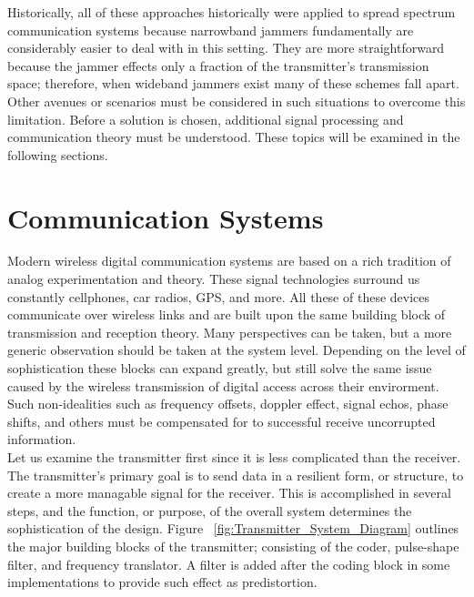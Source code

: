 Historically, all of these approaches historically were applied to spread spectrum communication systems because narrowband jammers fundamentally are considerably easier to deal with in this setting.  They are more straightforward because the jammer effects only a fraction of the transmitter's transmission space; therefore, when wideband jammers exist many of these schemes fall apart.  Other avenues or scenarios must be considered in such situations to overcome this limitation.  Before a solution is chosen, additional signal processing and communication theory must be understood.  These topics will be examined in the following sections.\\



\section{Communication Systems}

Modern wireless digital communication systems are based on a rich tradition of analog experimentation and theory.  These signal technologies surround us constantly cellphones, car radios, GPS, and more.  All these of these devices communicate over wireless links and are built upon the same building block of transmission and reception theory.  Many perspectives can be taken, but a more generic observation should be taken at the system level.  Depending on the level of sophistication these blocks can expand greatly, but still solve the same issue caused by the wireless transmission of digital access across their envirorment.  Such non-idealities such as frequency offsets, doppler effect, signal echos, phase shifts, and others must be compensated for to successful receive uncorrupted information.\\ 

Let us examine the transmitter first since it is less complicated than the receiver.  The transmitter's primary goal is to send data in a resilient form, or structure, to create a more managable signal for the receiver.  This is accomplished in several steps, and the function, or purpose, of the overall system determines the sophistication of the design.  Figure ~\ref{fig:Transmitter_System_Diagram} outlines the major building blocks of the transmitter; consisting of the coder, pulse-shape filter, and frequency translator.  A filter is added after the coding block in some implementations to provide such effect as predistortion.\\

